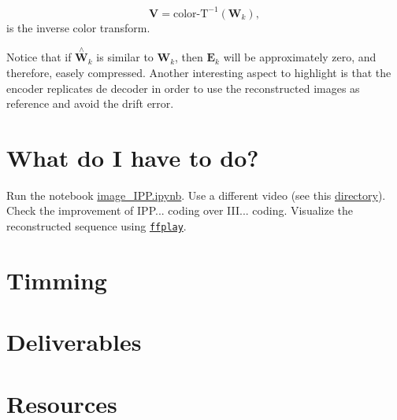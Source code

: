 \begin{equation}
   {\mathbf V} = \text{color-T}^{-1}({\mathbf W}_k),
  \tag{l}
\end{equation}
is the inverse color transform.

Notice that if $\overset{\wedge}{{\mathbf W}}_k$ is similar to
${\mathbf W}_k$, then ${\mathbf E}_k$ will be approximately zero, and
therefore, easely compressed. Another interesting aspect to highlight
is that the encoder replicates de decoder in order to use the
reconstructed images as reference and avoid the drift error.

\section{What do I have to do?}

Run the notebook \href{https://github.com/Sistemas-Multimedia/MRVC/blob/master/src/image_IPP.ipynb}{image\_IPP.ipynb}. Use a different video (see
this
\href{https://github.com/Sistemas-Multimedia/MRVC/tree/master/sequences}{directory}). Check
the improvement of IPP... coding over III... coding. Visualize the
reconstructed sequence using \href{https://ffmpeg.org/ffplay.html}{\texttt{ffplay}}.

\section{Timming}

\section{Deliverables}

\section{Resources}

\renewcommand{\addcontentsline}[3]{}%

